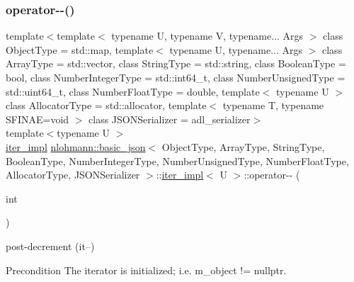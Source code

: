 \subsubsection{\texorpdfstring{operator-\/-\/()}{operator--()}\hspace{0.1cm}{\footnotesize\ttfamily [1/2]}}
{\footnotesize\ttfamily template$<$template$<$ typename U, typename V, typename... Args $>$ class Object\+Type = std\+::map, template$<$ typename U, typename... Args $>$ class Array\+Type = std\+::vector, class String\+Type  = std\+::string, class Boolean\+Type  = bool, class Number\+Integer\+Type  = std\+::int64\+\_\+t, class Number\+Unsigned\+Type  = std\+::uint64\+\_\+t, class Number\+Float\+Type  = double, template$<$ typename U $>$ class Allocator\+Type = std\+::allocator, template$<$ typename T, typename S\+F\+I\+N\+A\+E=void $>$ class J\+S\+O\+N\+Serializer = adl\+\_\+serializer$>$ \\
template$<$typename U $>$ \\
\mbox{\hyperlink{classnlohmann_1_1basic__json_1_1iter__impl}{iter\+\_\+impl}} \mbox{\hyperlink{classnlohmann_1_1basic__json}{nlohmann\+::basic\+\_\+json}}$<$ Object\+Type, Array\+Type, String\+Type, Boolean\+Type, Number\+Integer\+Type, Number\+Unsigned\+Type, Number\+Float\+Type, Allocator\+Type, J\+S\+O\+N\+Serializer $>$\+::\mbox{\hyperlink{classnlohmann_1_1basic__json_1_1iter__impl}{iter\+\_\+impl}}$<$ U $>$\+::operator-\/-\/ (\begin{DoxyParamCaption}\item[{int}]{ }\end{DoxyParamCaption})\hspace{0.3cm}{\ttfamily [inline]}}



post-\/decrement (it--) 

\begin{DoxyPrecond}{Precondition}
The iterator is initialized; i.\+e. {\ttfamily m\+\_\+object != nullptr}. 
\end{DoxyPrecond}
\mbox{\label{classnlohmann_1_1basic__json_1_1iter__impl_a50c5d20f733bfe2b13d67366102ba3fe}} 
